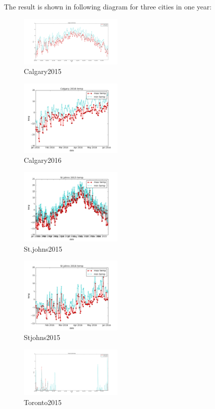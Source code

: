 \documentclass[DIV=calc, paper=a4, fontsize=11pt, twocolumn]{scrartcl}
\begin{document}
The result is shown in following diagram for three cities in one year:


\begin{figure}[h!]
	\centering
	\includegraphics[width=50mm]{../output/plot_images/Calgary_2015.png}
	\caption{Calgary2015}
	\label{fig:method}
\end{figure}
\begin{figure}[h!]
	\centering
	\includegraphics[width=50mm]{../output/plot_images/Calgary_2016.png}
	\caption{Calgary2016}
	\label{fig:method2}
\end{figure}

\begin{figure}[h!]
	\centering
	\includegraphics[width=50mm]{../output/plot_images/St.johns_2015.png}
	\caption{St.johns2015}
	\label{fig:method3}
\end{figure}

\begin{figure}[h!]
	\centering
	\includegraphics[width=50mm]{../output/plot_images/Stjohns_2016.png}
	\caption{Stjohns2015}
	\label{fig:method4}
\end{figure}
\begin{figure}[h!]
	\centering
	\includegraphics[width=50mm]{../output/plot_images/Toronto_2015.png}
	\caption{Toronto2015}
	\label{fig:method5}
\end{figure}
\end{document}

